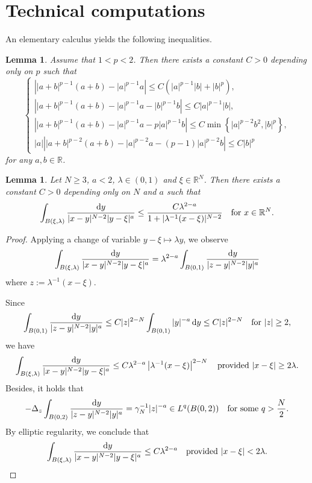 \documentclass[reqno]{amsart}
\newtheorem{lemma}[theorem]{Lemma}
\theoremstyle{remark}
\newcommand{\ga}{\gamma}
\newcommand{\R}{\mathbb{R}}
\newcommand{\dy}{\textup{d}y}
\renewcommand{\(}{\left(}
\renewcommand{\)}{\right)}
\numberwithin{equation}{section}
\begin{document}
\appendix
\section{Technical computations}\label{sec tech}
An elementary calculus yields the following inequalities.
\begin{lemma}
Assume that $1 < p < 2$. Then there exists a constant $C > 0$ depending only on $p$ such that
\begin{equation}\label{ele ineq}
\begin{cases}
\left||a+b|^{p-1}(a+b)-|a|^{p-1}a\right| \le C\(|a|^{p-1}|b|+|b|^p\),\\
\left||a+b|^{p-1}(a+b)-|a|^{p-1}a-|b|^{p-1}b\right| \le C|a|^{p-1}|b|,\\
\left||a+b|^{p-1}(a+b) - |a|^{p-1}a - p|a|^{p-1}b\right| \le C\min\left\{|a|^{p-2}b^2,|b|^p\right\},\\
|a|\left||a+b|^{p-2}(a+b) - |a|^{p-2}a - (p-1)|a|^{p-2}b\right| \le C|b|^p
\end{cases}
\end{equation}
for any $a, b \in \R$.
\end{lemma}

\begin{lemma}
Let $N \ge 3$, $a < 2$, $\lambda \in (0,1)$ and $\xi \in \R^N$. Then there exists a constant $C > 0$ depending only on $N$ and $a$ such that
\begin{equation}\label{interior es}
\int_{B(\xi,\lambda)} \frac{\dy}{|x-y|^{N-2}|y-\xi|^a} \le \frac{C\lambda^{2-a}}{1+|\lambda^{-1}(x-\xi)|^{N-2}} \quad \textup{for } x \in \R^N.
\end{equation}
\end{lemma}
\begin{proof}
Applying a change of variable $y-\xi \mapsto \lambda y$, we observe
\[\int_{B(\xi,\lambda)}\frac{\dy}{|x-y|^{N-2}|y-\xi|^a} = \lambda^{2-a} \int_{B(0,1)}\frac{\dy}{|z-y|^{N-2}|y|^a}\]
where $z := \lambda^{-1}(x-\xi)$.

Since
$$
\int_{B(0,1)}\frac{\dy}{|z-y|^{N-2}|y|^a} \le C|z|^{2-N}\int_{B(0,1)} |y|^{-a}\, \dy \le C|z|^{2-N} \quad \textup{for } |z| \ge 2,
$$
we have
$$
\int_{B(\xi,\lambda)}\frac{\dy}{|x-y|^{N-2}|y-\xi|^a} \le C\lambda^{2-a} \left|\lambda^{-1}(x-\xi)\right|^{2-N} \quad \textup{provided } |x-\xi| \ge 2\lambda.
$$
Besides, it holds that
\[-\Delta_z \int_{B(0,2)}\frac{\dy}{|z-y|^{N-2}|y|^a} = \ga_N^{-1} |z|^{-a}\in L^q(B(0,2)) \quad \textup{for some } q > \frac{N}{2}.\]
By elliptic regularity, we conclude that
\[\int_{B(\xi,\lambda)}\frac{\dy}{|x-y|^{N-2}|y-\xi|^a} \le C\lambda^{2-a} \quad \textup{provided } |x-\xi| < 2\lambda. \qedhere\]
\end{proof}
\end{document}
